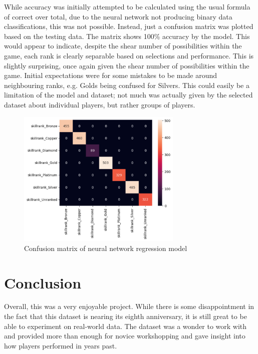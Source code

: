 \documentclass[12pt]{article}
\begin{document}
While accuracy was initially attempted to be calculated using the usual formula of correct over total, due to the neural network not producing binary data classifications, this was not possible.
Instead, just a confusion matrix was plotted based on the testing data.
The matrix shows 100\% accuracy by the model.
This would appear to indicate, despite the shear number of possibilities within the game, each rank is clearly separable based on selections and performance.
This is slightly surprising, once again given the shear number of possibilities within the game.
Initial expectations were for some mistakes to be made around neighbouring ranks, e.g. Golds being confused for Silvers.
This could easily be a limitation of the model and dataset; not much was actually given by the selected dataset about individual players, but rather groups of players.
\begin{figure}[H]
	\centering
	\includegraphics[width=0.7\textwidth]{nn-confusion-matrix}
	\caption{Confusion matrix of neural network regression model}
	\label{fig:nn-confusion-matrix}
\end{figure}

\newpage


\section{Conclusion}
Overall, this was a very enjoyable project.
While there is some disappointment in the fact that this dataset is nearing its eighth anniversary, it is still great to be able to experiment on real-world data.
The dataset was a wonder to work with and provided more than enough for novice workshopping and gave insight into how players performed in years past.
\end{document}
